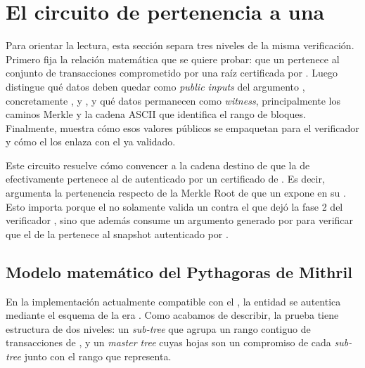 
\section{El circuito de pertenencia a una \texorpdfstring{\TransactionSnapshot}{TransactionSnapshot}}
\label{sec:tx-snapshot-membership-el-circuito-de-pertenencia-a-una-transactionsnapshot}

Para orientar la lectura, esta sección separa tres niveles de la misma verificación. Primero fija la relación matemática que se quiere probar: que un \TxId pertenece al conjunto de transacciones comprometido por una raíz \TxSetRoot certificada por \Mithril. Luego distingue qué datos deben quedar como \textit{public inputs} del argumento \Groth, concretamente \TxId, \SnapshotSubRoot y \TxSetRoot, y qué datos permanecen como \textit{witness}, principalmente los caminos Merkle y la cadena ASCII que identifica el rango de bloques. Finalmente, muestra cómo esos valores públicos se empaquetan para el verificador \Onchain y cómo el \MintingValidator los enlaza con el \TransactionSnapshotCertificate ya validado.

Este circuito resuelve cómo convencer a la cadena destino \ChainB de que la \LockTx de \ChainA efectivamente pertenece al \TransactionSnapshot de \Cardano autenticado por un certificado de \Mithril. Es decir, argumenta la pertenencia respecto de la Merkle Root de \CardanoTransactions que un \TransactionSnapshotCertificate expone en su \ProtocolMsg. Esto importa porque el \MintingValidator no solamente valida un \TransactionSnapshotCertificate contra el \ProofReceipt que dejó la fase 2 del verificador \STM, sino que además consume un argumento \Groth generado por \TxSnapshotMembershipCircuit para verificar que el \TxId de la \LockTx pertenece al snapshot autenticado por \TransactionSnapshotCertificate.

\subsection{Modelo matemático del \texorpdfstring{\TransactionSnapshot}{TransactionSnapshot} Pythagoras de Mithril}
\label{subsec:tx-snapshot-membership-modelo-matematico-del-transactionsnapshot-pythagoras-de-mithril}

En la implementación actualmente compatible con el \MithrilAggregator, la entidad \CardanoTransactions se autentica mediante el esquema \LegacyHashScheme de la era \Pythagoras. Como acabamos de describir, la prueba tiene estructura de dos niveles: un \emph{sub-tree} que agrupa un rango contiguo de transacciones de \Cardano, y un \emph{master tree} cuyas hojas son un compromiso de cada \textit{sub-tree} junto con el rango que representa.

